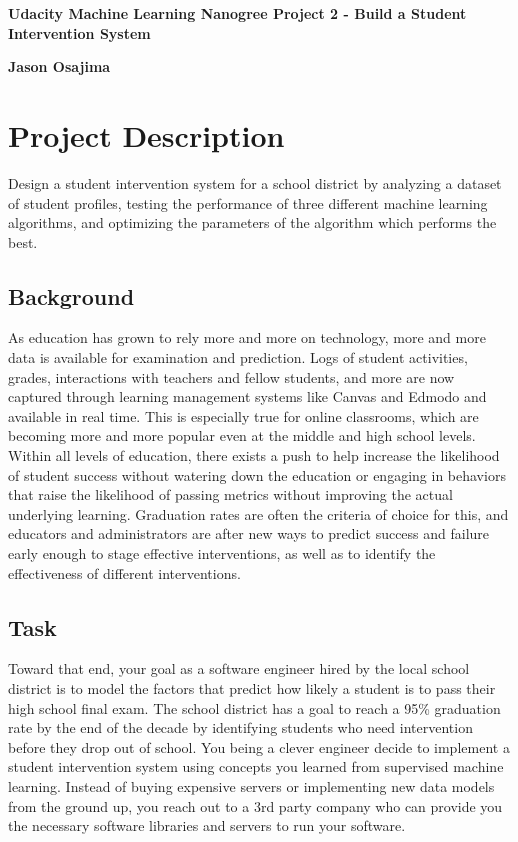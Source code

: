 \documentclass[11pt]{article}
\begin{document}
\begin{center}
    \Large
    \textbf{Udacity Machine Learning Nanogree Project 2 - Build a Student Intervention System}
    
    \vspace{0.4cm}
    \large
    \textbf{Jason Osajima}
\end{center}



\section{Project Description}
\label{Summary}

Design a student intervention system for a school district by analyzing a dataset of student profiles, testing the performance of three different machine learning algorithms, and optimizing the parameters of the algorithm which performs the best. 


\subsection{Background}

As education has grown to rely more and more on technology, more and more data is available for examination and prediction. Logs of student activities, grades, interactions with teachers and fellow students, and more are now captured through learning management systems like Canvas and Edmodo and available in real time. This is especially true for online classrooms, which are becoming more and more popular even at the middle and high school levels.\\

Within all levels of education, there exists a push to help increase the likelihood of student success without watering down the education or engaging in behaviors that raise the likelihood of passing metrics without improving the actual underlying learning. Graduation rates are often the criteria of choice for this, and educators and administrators are after new ways to predict success and failure early enough to stage effective interventions, as well as to identify the effectiveness of different interventions.

\subsection{Task}

Toward that end, your goal as a software engineer hired by the local school district is to model the factors that predict how likely a student is to pass their high school final exam. The school district has a goal to reach a 95\% graduation rate by the end of the decade by identifying students who need intervention before they drop out of school. You being a clever engineer decide to implement a student intervention system using concepts you learned from supervised machine learning. Instead of buying expensive servers or implementing new data models from the ground up, you reach out to a 3rd party company who can provide you the necessary software libraries and servers to run your software.
\end{document}
